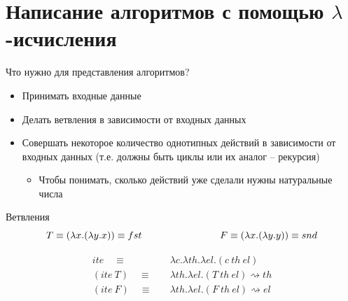 \section{Написание алгоритмов с помощью $\lambda$-исчисления}

\begin{frame}{Что нужно для представления алгоритмов?}
  \begin{itemize}
    \item Принимать входные данные
    \item Делать ветвления  в зависимости от входных данных
    \item Совершать некоторое количество однотипных действий в зависимости от входных данных (т.е. должны быть циклы или их аналог -- рекурсия)
    \begin{itemize}
\item       Чтобы понимать, сколько действий уже сделали нужны натуральные числа
    \end{itemize}
  \end{itemize}
\end{frame}

\begin{frame}{Ветвления}
\[
T\equiv(\lambda x . (\lambda y . x)) \equiv fst \qquad \qquad \qquad \qquad
F\equiv (\lambda x . (\lambda y . y))\equiv snd
\]

\begin{align*}
  ite \quad\equiv &\quad \lambda c. \lambda th. \lambda el. (c\ th\ el)\\
  (ite\ T) \quad\equiv &\quad  \lambda th. \lambda el. (T\ th\ el) \rightsquigarrow th\\
  (ite\ F) \quad\equiv &\quad  \lambda th. \lambda el. (F\ th\ el) \rightsquigarrow el
\end{align*}
\end{frame}

